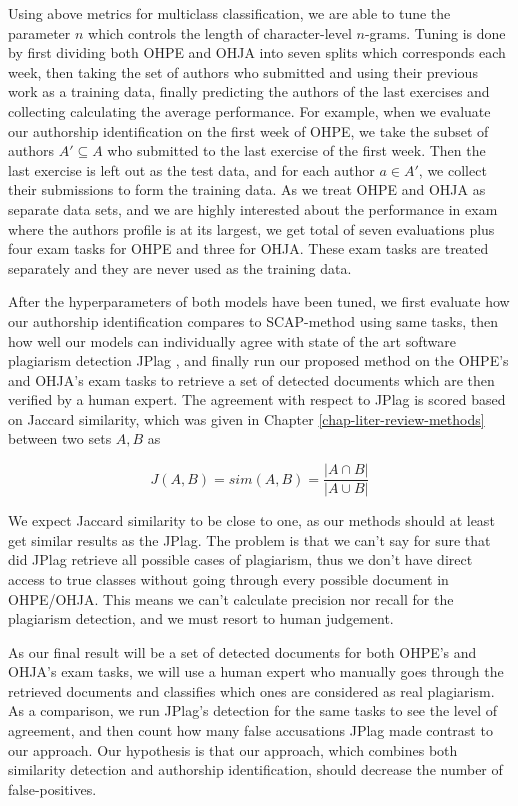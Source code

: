 \noindent
Using above metrics for multiclass classification, we are able to tune the parameter $n$ which controls the length of character-level $n$-grams. Tuning is done by first dividing both OHPE and OHJA into seven splits which corresponds each week, then taking the set of authors who submitted and using their previous work as a training data, finally predicting the authors of the last exercises and collecting calculating the average performance. For example, when we evaluate our authorship identification on the first week of OHPE, we take the subset of authors $A' \subseteq A$ who submitted to the last exercise of the first week. Then the last exercise is left out as the test data, and for each author $a \in A'$, we collect their submissions to form the training data. As we treat OHPE and OHJA as separate data sets, and we are highly interested about the performance in exam where the authors profile is at its largest, we get total of seven evaluations plus four exam tasks for OHPE and three for OHJA. These exam tasks are treated separately and they are never used as the training data. 

After the hyperparameters of both models have been tuned, we first evaluate how our authorship identification compares to SCAP-method using same tasks, then how well our models can individually agree with state of the art software plagiarism detection JPlag \cite{prechelt2002finding}, and finally run our proposed method on the OHPE's and OHJA's exam tasks to retrieve a set of detected documents which are then verified by a human expert. The agreement with respect to JPlag is scored based on Jaccard similarity, which was given in Chapter \ref{chap-liter-review-methods} between two sets $A, B$ as

\begin{equation}
    J(A,B) = sim(A,B) = \dfrac{|A \cap B|}{|A \cup B|}
\end{equation}

\noindent
We expect Jaccard similarity to be close to one, as our methods should at least get similar results as the JPlag. The problem is that we can't say for sure that did JPlag retrieve all possible cases of plagiarism, thus we don't have direct access to true classes without going through every possible document in OHPE/OHJA. This means we can't calculate precision nor recall for the plagiarism detection, and we must resort to human judgement. 

As our final result will be a set of detected documents for both OHPE's and OHJA's exam tasks, we will use a human expert who manually goes through the retrieved documents and classifies which ones are considered as real plagiarism. As a comparison, we run JPlag's detection for the same tasks to see the level of agreement, and then count how many false accusations JPlag made contrast to our approach. Our hypothesis is that our approach, which combines both similarity detection and authorship identification, should decrease the number of false-positives.  
